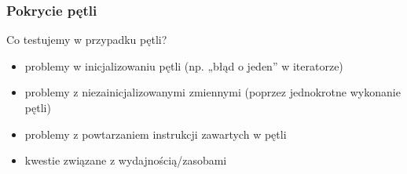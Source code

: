\documentclass[../main.tex]{subfiles}
\begin{document}
    \subsubsection{Pokrycie pętli}

    Co testujemy w przypadku pętli?
    \begin{itemize}
        \item problemy w inicjalizowaniu pętli (np. „błąd o jeden” w iteratorze)
        \item problemy z niezainicjalizowanymi zmiennymi (poprzez jednokrotne
        wykonanie pętli)
        \item problemy z powtarzaniem instrukcji zawartych w pętli
        \item kwestie związane z wydajnością/zasobami
    \end{itemize}
\end{document}
